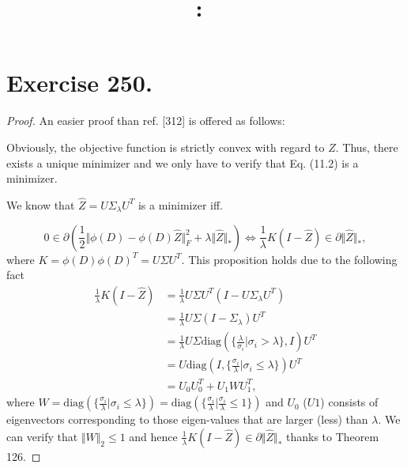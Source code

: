 \documentclass{article}
\date{}
\title{
    \textmd{\textbf{\hmwkClass:\ \hmwkTitle}}\\
}
\author{\hmwkAuthorName}
\begin{document}
\maketitle

\section{Exercise 250.}
\begin{proof}
An easier proof than ref. [312] is offered as follows:

Obviously, the objective function is strictly convex with regard to $Z$. Thus, there exists a unique minimizer and we only have to verify that Eq. (11.2) is a minimizer. 

We know that $\hat{Z} = U\Sigma_{\lambda}U^{T}$ is a minimizer iff. 

$$
0 \in \partial(\frac{1}{2}\Vert \phi(D) - \phi(D)\hat{Z} \Vert_F^2 + \lambda\Vert \hat{Z} \Vert_{*}) \Leftrightarrow \frac{1}{\lambda}K(I - \hat{Z}) \in   \partial \Vert  \hat{Z} \Vert_{*},
$$
where $K = \phi(D)\phi(D)^{T} = U \Sigma U^{T}$. This proposition holds due to the following fact
\begin{align*}
    \frac{1}{\lambda}K(I - \hat{Z}) &=\frac{1}{\lambda} U \Sigma U^{T} ( I - U\Sigma_{\lambda}U^{T}) \\
    &=  \frac{1}{\lambda} U \Sigma (I - \Sigma_{\lambda}) U^{T} \\
    &= \frac{1}{\lambda} U \Sigma \text{diag}(\{\frac{\lambda}{\sigma_i}\vert \sigma_i > \lambda\},I) U^{T} \\
    &= U \text{diag}(I,\{\frac{\sigma_i}{\lambda}\vert \sigma_i \leq \lambda \}) U^T \\
    &= U_0U_0^{T} + U_1 W U_1^T,
\end{align*}
where $W = \text{diag}(\{\frac{\sigma_i}{\lambda}\vert \sigma_i \leq \lambda \}) = \text{diag}(\{\frac{\sigma_i}{\lambda}\vert \frac{\sigma_i}{\lambda} \leq 1 \})$ and $U_0$ ($U1$) consists of eigenvectors corresponding to those eigen-values that are larger (less) than $\lambda$. We can verify that $\Vert W \Vert_2 \leq 1$ and hence $\frac{1}{\lambda}K(I - \hat{Z}) \in   \partial \Vert  \hat{Z} \Vert_{*}$ thanks to Theorem 126.
\end{proof}
\end{document}
